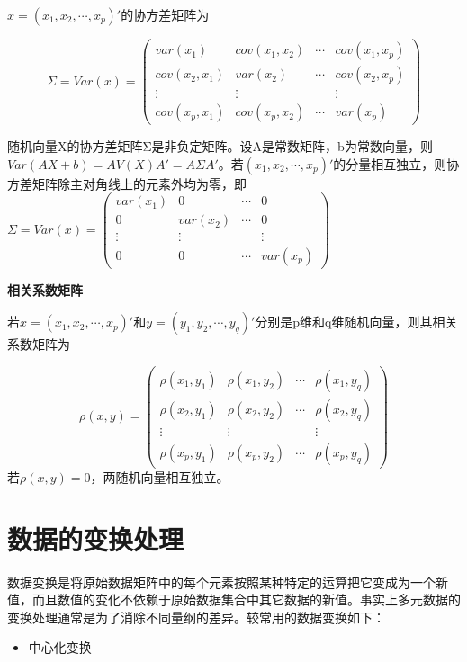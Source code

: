 \documentclass[]{ctexbook}
\providecommand{\tightlist}{%
  \setlength{\itemsep}{0pt}\setlength{\parskip}{0pt}}
\begin{document}
\(x=(x_1,x_2,\cdots,x_p)'\)的协方差矩阵为

\[\Sigma=Var(x)=\begin {pmatrix} var(x_1) & cov(x_1,x_2) & \cdots & cov(x_1,x_p) \\ cov(x_2,x_1) & var(x_2) & \cdots & cov(x_2,x_p) \\ \vdots & \vdots &  & \vdots \\ cov(x_p,x_1) & cov(x_p,x_2) & \cdots & var(x_p) \end {pmatrix}\]

随机向量X的协方差矩阵Σ是非负定矩阵。设A是常数矩阵，b为常数向量，则
\(Var(AX+b)=AV(X)A'=A\Sigma A'\)。若\((x_1,x_2,\cdots,x_p)'\)的分量相互独立，则协方差矩阵除主对角线上的元素外均为零，即
\(\Sigma=Var(x)=\begin {pmatrix} var(x_1) & 0 & \cdots & 0 \\ 0 & var(x_2) & \cdots & 0 \\ \vdots & \vdots & & \vdots \\ 0 & 0 & \cdots & var(x_p) \end {pmatrix}\)

\textbf{相关系数矩阵}

若\(x=(x_1,x_2,\cdots,x_p)'\)和\(y=(y_1,y_2,\cdots,y_q)'\)分别是p维和q维随机向量，则其相关系数矩阵为

\[\rho (x,y)=\begin {pmatrix} \rho (x_1,y_1) & \rho (x_1,y_2) & \cdots & \rho (x_1,y_q) \\ \rho (x_2,y_1) & \rho (x_2,y_2) & \cdots & \rho (x_2,y_q) \\ \vdots & \vdots &  & \vdots \\ \rho (x_p,y_1) & \rho (x_p,y_2) & \cdots & \rho (x_p,y_q) \end {pmatrix}\]
若\(\rho (x,y)=0\)，两随机向量相互独立。

\hypertarget{ux6570ux636eux7684ux53d8ux6362ux5904ux7406}{%
\section{数据的变换处理}\label{ux6570ux636eux7684ux53d8ux6362ux5904ux7406}}

数据变换是将原始数据矩阵中的每个元素按照某种特定的运算把它变成为一个新值，而且数值的变化不依赖于原始数据集合中其它数据的新值。事实上多元数据的变换处理通常是为了消除不同量纲的差异。较常用的数据变换如下：

\begin{itemize}
\tightlist
\item
  中心化变换
\end{itemize}
\end{document}
